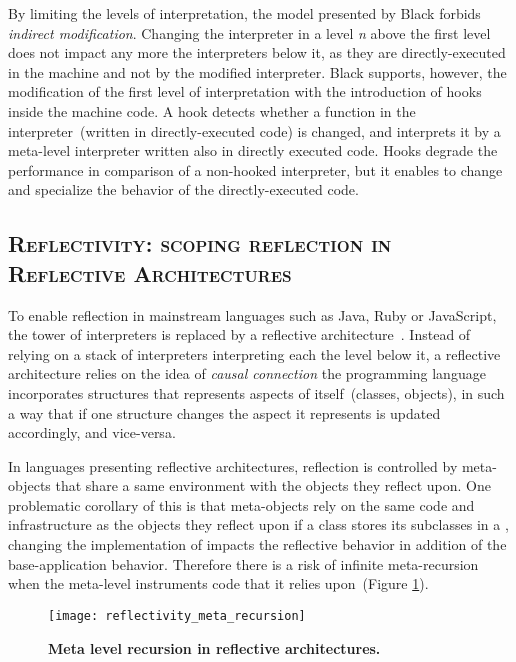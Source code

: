 By limiting the levels of interpretation, the model presented by Black forbids \emph{indirect modification}. Changing the interpreter in a level \emph{n} above the first level does not impact any more the interpreters below it, as they are directly-executed in the machine and not by the modified interpreter. Black supports, however, the modification of the first level of interpretation with the introduction of hooks inside the machine code. A hook detects whether a function in the interpreter~(written in directly-executed code) is changed, and interprets it by a meta-level interpreter written also in directly executed code. Hooks degrade the performance in comparison of a non-hooked interpreter, but it enables to change and specialize the behavior of the directly-executed code.

\subsection*{\textsc{Reflectivity: scoping reflection in Reflective Architectures}}

To enable reflection in mainstream languages such as Java, Ruby or JavaScript, the tower of interpreters is replaced by a reflective architecture~\cite{Maes87a}. Instead of relying on a stack of interpreters interpreting each the level below it, a reflective architecture relies on the idea of \emph{causal connection} \ie the programming language incorporates structures that represents aspects of itself~(\eg classes, objects), in such a way that if one structure changes the aspect it represents is updated accordingly, and vice-versa.


In languages presenting reflective architectures, reflection is controlled by meta-objects that share a same environment with the objects they reflect upon.
One problematic corollary of this is that meta-objects rely on the same code and infrastructure as the objects they reflect upon \eg if a class stores its subclasses in a , changing the  implementation of  impacts the reflective behavior in addition of the base-application behavior.
Therefore there is a risk of infinite meta-recursion when the meta-level instruments code that it relies upon~(Figure \ref{fig:reflectivity_meta_recursion}).

\begin{figure}[ht]
\begin{center}
\texttt{[image: reflectivity\_meta\_recursion]}
\caption{\textbf{Meta level recursion in reflective architectures.}\label{fig:reflectivity_meta_recursion}
 }
\end{center}
\end{figure}

